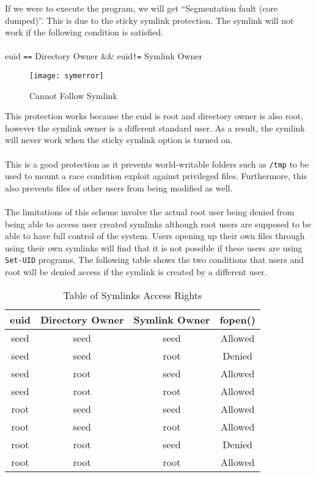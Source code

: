 \documentclass[a4paper,12pt]{article}
\newcommand*\circled[1]{\tikz[baseline=(char.base)]{
		\node[shape=circle,draw,inner sep=2pt] (char) {#1};}}
\begin{document}
\noindent If we were to execute the program, we will get ``Segmentation fault (core dumped)''. This is due to the sticky symlink protection. The symlink will not work if the following condition is satisfied.\\\\euid \texttt{==} Directory Owner \&\& euid\texttt{!=} Symlink Owner
\begin{figure}[H]
	\centering
	\texttt{[image: symerror]}
	\caption{Cannot Follow Symlink}
	\label{fig:symerror}
\end{figure}
\noindent \circled{1} This protection works because the euid is root and directory owner is also root, however the symlink owner is a different standard user. As a result, the symlink will never work when the sticky symlink option is turned on.
\\\\\circled{2} This is a good protection as it prevents world-writable folders such as \texttt{/tmp} to be used to mount a race condition exploit against privileged files. Furthermore, this also prevents files of other users from being modified as well.
\\\\\circled{3} The limitations of this scheme involve the actual root user being denied from being able to access user created symlinks although root users are supposed to be able to have full control of the system. Users opening up their own files through using their own symlinks will find that it is not possible if these users are using \texttt{Set-UID} programs. The following table shows the two conditions that users and root will be denied access if the symlink is created by a different user.
\begin{table}[H]
	\centering
	\label{symtab}
	\bgroup
	\def\arraystretch{1.3}
	\begin{tabular}{|c|c|c|c|}
		\hline
		euid & Directory Owner & Symlink Owner & fopen() \\ \hline
		seed & seed            & seed          & Allowed \\ \hline
		\rowcolor[HTML]{fffe65}
		seed & seed            & root          & Denied  \\ \hline
		seed & root            & seed          & Allowed \\ \hline
		seed & root            & root          & Allowed \\ \hline
		root & seed            & seed          & Allowed \\ \hline
		root & seed            & root          & Allowed \\ \hline
		\rowcolor[HTML]{fffe65} 
		root & root            & seed          & Denied  \\ \hline
		root & root            & root          & Allowed \\ \hline
	\end{tabular}
\egroup
\caption{Table of Symlinks Access Rights}
\end{table}
\end{document}
